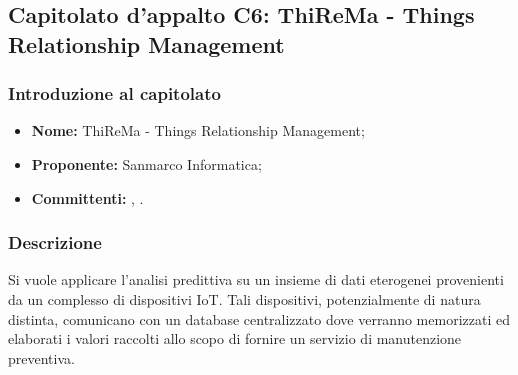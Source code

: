 \subsection{Capitolato d'appalto C6: ThiReMa - Things Relationship Management}
	\subsubsection{Introduzione al capitolato}
	\begin{itemize}
		\item \textbf{Nome:} ThiReMa - Things Relationship Management;
		\item \textbf{Proponente}\textbf{:} Sanmarco Informatica;
		\item \textbf{Committenti}\textbf{:} \TV, \RC.
	\end{itemize}
	\subsubsection{Descrizione}
	Si vuole applicare l'analisi predittiva su un insieme di dati eterogenei provenienti da un complesso di dispositivi IoT. Tali dispositivi, potenzialmente di natura distinta, comunicano con un database centralizzato dove verranno memorizzati ed elaborati i valori raccolti allo scopo di fornire un servizio di manutenzione preventiva.  
